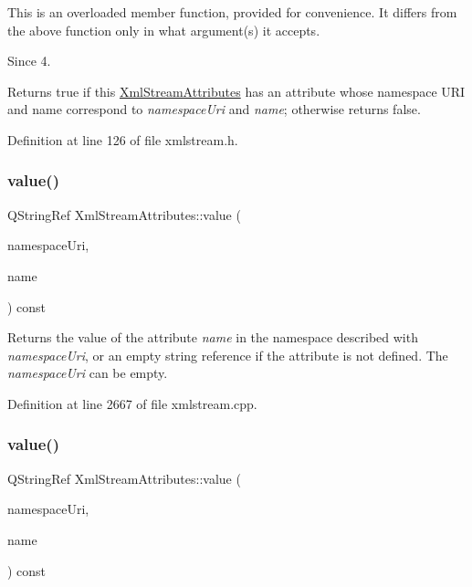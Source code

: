This is an overloaded member function, provided for convenience. It differs from the above function only in what argument(s) it accepts. \begin{DoxySince}{Since}
4.
\end{DoxySince}
Returns {\ttfamily true} if this \hyperlink{class_xml_stream_attributes}{Xml\+Stream\+Attributes} has an attribute whose namespace U\+RI and name correspond to {\itshape namespace\+Uri} and {\itshape name}; otherwise returns {\ttfamily false}. 

Definition at line 126 of file xmlstream.\+h.

\mbox{\label{class_xml_stream_attributes_ac13c28528742b32ef4c4684f8c39941b}} 
\subsubsection{\texorpdfstring{value()}{value()}\hspace{0.1cm}{\footnotesize\ttfamily [1/5]}}
{\footnotesize\ttfamily Q\+String\+Ref Xml\+Stream\+Attributes\+::value (\begin{DoxyParamCaption}\item[{const Q\+String \&}]{namespace\+Uri,  }\item[{const Q\+String \&}]{name }\end{DoxyParamCaption}) const}

Returns the value of the attribute {\itshape name} in the namespace described with {\itshape namespace\+Uri}, or an empty string reference if the attribute is not defined. The {\itshape namespace\+Uri} can be empty. 

Definition at line 2667 of file xmlstream.\+cpp.

\mbox{\label{class_xml_stream_attributes_a6b298362365a1199b9287dbbcbcf39c0}} 
\subsubsection{\texorpdfstring{value()}{value()}\hspace{0.1cm}{\footnotesize\ttfamily [2/5]}}
{\footnotesize\ttfamily Q\+String\+Ref Xml\+Stream\+Attributes\+::value (\begin{DoxyParamCaption}\item[{const Q\+String \&}]{namespace\+Uri,  }\item[{Q\+Latin1\+String}]{name }\end{DoxyParamCaption}) const}

